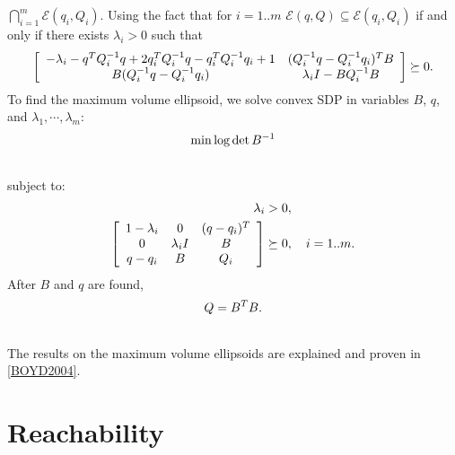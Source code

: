 \documentclass[letterpaper,10pt,english]{sphinxmanual}
\begin{document}
$\bigcap_{i=1}^m{\mathcal E}(q_i,Q_i)$. Using the fact that for
$i=1..m$ ${\mathcal E}(q,Q)\subseteq{\mathcal E}(q_i,Q_i)$
if and only if there exists $\lambda_i>0$ such that
\begin{gather}
\begin{split}\left[\begin{array}{cc}
-\lambda_i - q^TQ_i^{-1}q + 2q_i^TQ_i^{-1}q - q_i^TQ_i^{-1}q_i + 1 & (Q_i^{-1}q-Q_i^{-1}q_i)^TB\\
B(Q_i^{-1}q-Q_i^{-1}q_i) & \lambda_iI-BQ_i^{-1}B\end{array}\right] \succeq 0.\end{split}\notag
\end{gather}
To find the maximum volume ellipsoid, we solve convex SDP in variables
$B$, $q$, and $\lambda_1,\cdots,\lambda_m$:
\begin{gather}
\begin{split}\min \log \det B^{-1}\end{split}\notag\\\begin{split}\end{split}\notag
\end{gather}
subject to:
\begin{gather}
\begin{split}\begin{aligned}
\lambda_i & >  0, \\
\left[\begin{array}{ccc}
1-\lambda_i & 0 & (q - q_i)^T\\
0 & \lambda_iI & B\\
q - q_i & B & Q_i\end{array}\right] & \succeq  0, ~~~ i=1..m.\end{aligned}\end{split}\notag
\end{gather}
After $B$ and $q$ are found,
\begin{gather}
\begin{split}Q = B^TB.\end{split}\notag\\\begin{split}\end{split}\notag
\end{gather}
The results on the maximum volume ellipsoids are explained and proven in
{\hyperref[chap_ellcalc:boyd2004]{{[}BOYD2004{]}}}.


\chapter{Reachability}
\label{chap_reach:reachability}\label{chap_reach::doc}
\end{document}
